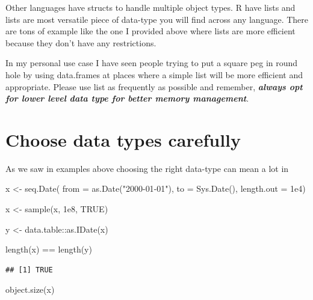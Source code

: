 \documentclass[
]{book}
\newenvironment{Shaded}{\begin{snugshade}}{\end{snugshade}}
\newcommand{\AttributeTok}[1]{\textcolor[rgb]{0.77,0.63,0.00}{#1}}
\newcommand{\ConstantTok}[1]{\textcolor[rgb]{0.00,0.00,0.00}{#1}}
\newcommand{\FloatTok}[1]{\textcolor[rgb]{0.00,0.00,0.81}{#1}}
\newcommand{\FunctionTok}[1]{\textcolor[rgb]{0.00,0.00,0.00}{#1}}
\newcommand{\NormalTok}[1]{#1}
\newcommand{\OtherTok}[1]{\textcolor[rgb]{0.56,0.35,0.01}{#1}}
\newcommand{\SpecialCharTok}[1]{\textcolor[rgb]{0.00,0.00,0.00}{#1}}
\newcommand{\StringTok}[1]{\textcolor[rgb]{0.31,0.60,0.02}{#1}}
\begin{document}
Other languages have structs to handle multiple object types. R have lists and lists are most versatile piece of data-type you will find across any language. There are tons of example like the one I provided above where lists are more efficient because they don't have any restrictions.

In my personal use case I have seen people trying to put a square peg in round hole by using data.frames at places where a simple list will be more efficient and appropriate. Please use list as frequently as possible and remember, \textbf{\emph{always opt for lower level data type for better memory management}}.

\hypertarget{choose-data-types-carefully}{%
\section{Choose data types carefully}\label{choose-data-types-carefully}}

As we saw in examples above choosing the right data-type can mean a lot in

\begin{Shaded}
\begin{Highlighting}[]
\NormalTok{x }\OtherTok{\textless{}{-}} \FunctionTok{seq.Date}\NormalTok{(}
  \AttributeTok{from =} \FunctionTok{as.Date}\NormalTok{(}\StringTok{"2000{-}01{-}01"}\NormalTok{),}
  \AttributeTok{to =} \FunctionTok{Sys.Date}\NormalTok{(),}
  \AttributeTok{length.out =} \FloatTok{1e4}\NormalTok{)}

\NormalTok{x }\OtherTok{\textless{}{-}} \FunctionTok{sample}\NormalTok{(x, }\FloatTok{1e8}\NormalTok{, }\ConstantTok{TRUE}\NormalTok{)}

\NormalTok{y }\OtherTok{\textless{}{-}}\NormalTok{ data.table}\SpecialCharTok{::}\FunctionTok{as.IDate}\NormalTok{(x)}

\FunctionTok{length}\NormalTok{(x) }\SpecialCharTok{==} \FunctionTok{length}\NormalTok{(y)}
\end{Highlighting}
\end{Shaded}

\begin{verbatim}
## [1] TRUE
\end{verbatim}

\begin{Shaded}
\begin{Highlighting}[]
\FunctionTok{object.size}\NormalTok{(x)}
\end{Highlighting}
\end{Shaded}
\end{document}
